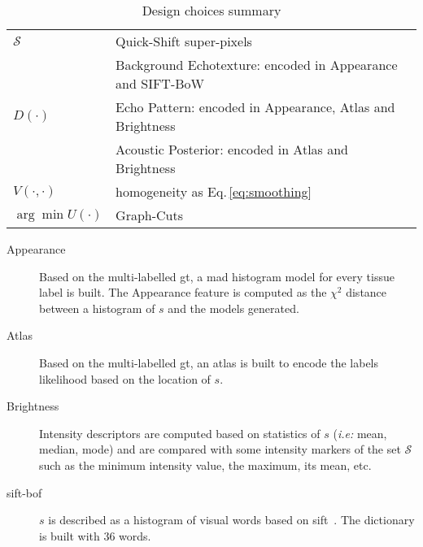 \begin{table*}[!htb]
  \scriptsize
  \centering
  \scriptsize
  \caption{Design choices summary}
  \label{tab:method}
  \renewcommand{\arraystretch}{1.3}
  \begin{tabular}{>{\centering\bfseries}m{1in} l}
    \hline
    $\mathcal{S}$ & Quick-Shift super-pixels \\
    & Background Echotexture: encoded in Appearance and SIFT-BoW\\
    $D(\cdot)$ & Echo Pattern: encoded in Appearance, Atlas and Brightness\\%
    & Acoustic Posterior: encoded in Atlas and Brightness\\
    $V(\cdot,\cdot)$ & homogeneity as Eq.\,\eqref{eq:smoothing} \\
    $\arg \min U(\cdot)$ & Graph-Cuts \\ \hline
  \end{tabular}
\end{table*}

\begin{description}
  \item[Appearance]
    Based on the multi-labelled \ac{gt}, a \ac{mad} histogram model for every tissue label is built. The Appearance feature is computed as the $\chi^2$ distance between a histogram of $s$ and the models generated.
  \item[Atlas]
    Based on the multi-labelled \ac{gt}, an atlas is built to encode the labels likelihood based on the location of $s$.
  \item[Brightness]
    Intensity descriptors are computed based on statistics of $s$ (\emph{i.e:} mean, median, mode) and  are compared with some intensity markers of the set $\mathcal{S}$ such as the minimum intensity value, the maximum, its mean, etc.
  \item[\ac{sift}-\ac{bof}]
    $s$ is described as a histogram of visual words based on \ac{sift}~\cite{massich2014sift}. The dictionary is built with $36$ words.
\end{description}

